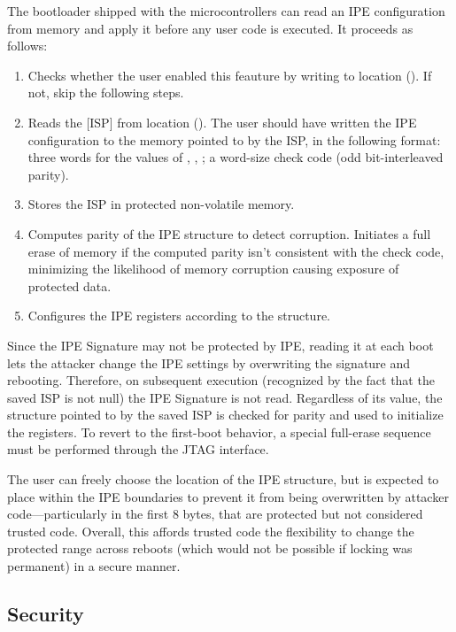 The bootloader shipped with the \msp microcontrollers can read an IPE configuration from memory and apply it before any user code is executed.  It proceeds as follows:
\begin{enumerate}
\item Checks whether the user enabled this feauture by writing  to location  (). If not, skip the following steps.
\item Reads the [ISP] from location  (). The user should have written the IPE configuration to the memory pointed to by the ISP, in the following format: three words for the values of , , ; a word-size check code (odd bit-interleaved parity).
\item Stores the ISP in protected non-volatile memory.
\item Computes parity of the IPE structure to detect corruption. Initiates a full erase of memory if the computed parity isn't consistent with the check code, minimizing the likelihood of memory corruption causing exposure of protected data.
\item Configures the IPE registers according to the structure.
\end{enumerate}

Since the IPE Signature may not be protected by IPE, reading it at each boot lets the attacker change the IPE settings by overwriting the signature and rebooting. Therefore, on subsequent execution (recognized by the fact that the saved ISP is not null) the IPE Signature is not read. Regardless of its value, the structure pointed to by the saved ISP is checked for parity and used to initialize the registers.  To revert to the first-boot behavior, a special full-erase sequence must be performed through the JTAG interface.

The user can freely choose the location of the IPE structure, but is expected to place within the IPE boundaries to prevent it from being overwritten by attacker code---particularly in the first 8 bytes, that are protected but not considered trusted code. Overall, this affords trusted code the flexibility to change the protected range across reboots (which would not be possible if locking was permanent) in a secure manner.

\subsection{Security}
\label{sec:ipe-attacks}


